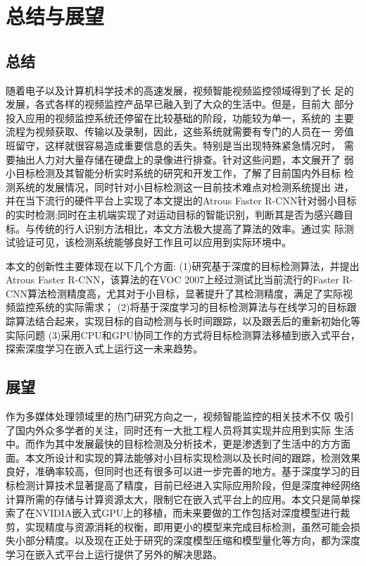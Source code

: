 \chapter{总结与展望}

\section{总结}
随着电子以及计算机科学技术的高速发展，视频智能视频监控领域得到了长 足的发展，各式各样的视频监控产品早已融入到了大众的生活中。但是，目前大 部分投入应用的视频监控系统还停留在比较基础的阶段，功能较为单一，系统的 主要流程为视频获取、传输以及录制，因此，这些系统就需要有专门的人员在一 旁值班留守，这样就很容易造成重要信息的丢失。特别是当出现特殊紧急情况时， 需要抽出人力对大量存储在硬盘上的录像进行排查。针对这些问题，本文展开了 弱小目标检测及其智能分析实时系统的研究和开发工作，了解了目前国内外目标 检测系统的发展情况，同时针对小目标检测这一目前技术难点对检测系统提出 进，并在当下流行的硬件平台上实现了本文提出的Atrous Faster R-CNN针对弱小目标的实时检测;同时在主机端实现了对运动目标的智能识别，判断其是否为感兴趣目标。与传统的行人识别方法相比，本文方法极大提高了算法的效率。通过实 际测试验证可见，该检测系统能够良好工作且可以应用到实际环境中。

本文的创新性主要体现在以下几个方面:
(1)研究基于深度的目标检测算法，并提出Atrous Faster R-CNN，该算法的在VOC 2007上经过测试比当前流行的Faster R-CNN算法检测精度高，尤其对于小目标，显著提升了其检测精度，满足了实际视频监控系统的实际需求；
(2)将基于深度学习的目标检测算法与在线学习的目标跟踪算法结合起来，实现目标的自动检测与长时间跟踪，以及跟丢后的重新初始化等实际问题
(3)采用CPU和GPU协同工作的方式将目标检测算法移植到嵌入式平台，探索深度学习在嵌入式上运行这一未来趋势。

\section{展望}
作为多媒体处理领域里的热门研究方向之一，视频智能监控的相关技术不仅 吸引了国内外众多学者的关注，同时还有一大批工程人员将其实现并应用到实际 生活中。而作为其中发展最快的目标检测及分析技术，更是渗透到了生活中的方方面面。本文所设计和实现的算法能够对小目标实现检测以及长时间的跟踪，检测效果良好，准确率较高，但同时也还有很多可以进一步完善的地方。基于深度学习的目标检测计算技术显著提高了精度，目前已经进入实际应用阶段，但是深度神经网络计算所需的存储与计算资源太大，限制它在嵌入式平台上的应用。本文只是简单探索了在NVIDIA嵌入式GPU上的移植，而未来要做的工作包括对深度模型进行裁剪，实现精度与资源消耗的权衡，即用更小的模型来完成目标检测，虽然可能会损失小部分精度。以及现在正处于研究的深度模型压缩和模型量化等方向，都为深度学习在嵌入式平台上运行提供了另外的解决思路。